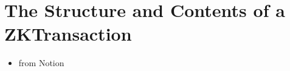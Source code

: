\chapter*{The Structure and Contents of a ZKTransaction}

\begin{itemize}
\item from Notion
\end{itemize}